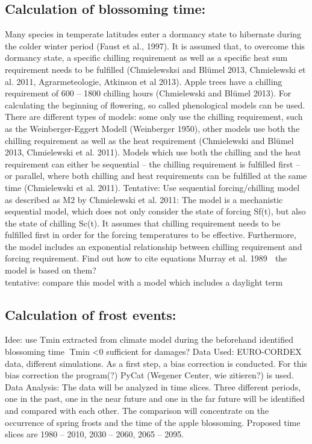 \subsection{{Calculation of blossoming time:  } }
Many species in temperate latitudes enter a dormancy state to hibernate during the colder winter period (Faust et al., 1997). It is assumed that, to overcome this dormancy state, a specific chilling requirement as well as a specific heat sum requirement needs to be fulfilled (Chmielewsksi and Blümel 2013, Chmielewski et al. 2011, Agrarmeteologie, Atkinson et al 2013). Apple trees have a chilling requirement of 600 – 1800 chilling hours (Chmielewski and Blümel 2013). For calculating the beginning of flowering, so called phenological models can be used. There are different types of models: some only use the chilling requirement, such as the Weinberger-Eggert Modell (Weinberger 1950), other models use both the chilling requirement as well as the heat requirement (Chmielewski and Blümel 2013, Chmielewski et al. 2011). Models which use both the chilling and the heat requirement can either be sequential – the chilling requirement is fulfilled first – or parallel, where both chilling and heat requirements can be fulfilled at the same time (Chmielewski et al. 2011). 
Tentative: Use sequential forcing/chilling model as described as M2 by Chmielewski et al. 2011:
The model is a mechanistic sequential model, which does not only consider the state of forcing Sf(t), but also the state of chilling Sc(t). It assumes that chilling requirement needs to be fulfilled first in order for the forcing temperatures to be effective. Furthermore, the model includes an exponential relationship between chilling requirement and forcing requirement. 
\todo Find out how to cite equations
Murray et al. 1989  the model is based on them? \\

\todo tentative: compare this model with a model which includes a daylight term


\subsection{{Calculation of frost events: } }
Idee: use Tmin extracted from climate model during the beforehand identified blossoming time Tmin <0 sufficient for damages?
Data Used:
EURO-CORDEX data, different simulations.
As a first step, a bias correction is conducted. For this bias correction the program(?) PyCat (Wegener Center, wie zitieren?) is used. 
Data Analysis:
The data will be analyzed in time slices. Three different periods, one in the past, one in the near future and one in the far future will be identified and compared with each other. The comparison will concentrate on the occurrence of spring frosts and the time of the apple blossoming. Proposed time slices are 1980 – 2010, 2030 – 2060, 2065 – 2095. \\


